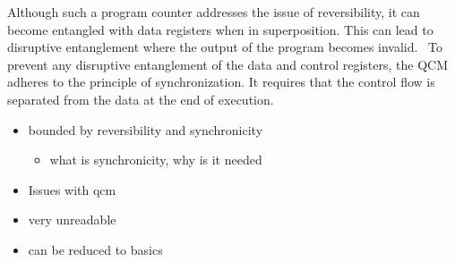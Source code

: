 Although such a program counter addresses the issue of reversibility, it can become entangled with data registers when in superposition. This can lead to disruptive entanglement where the output of the program becomes invalid.~\cite{YVC24} To prevent any disruptive entanglement of the data and control registers, the QCM adheres to the principle of synchronization. It requires that the control flow is separated from the data at the end of execution. 

\begin{itemize}
    \item bounded by reversibility and synchronicity
    \begin{itemize}
        \item what is synchronicity, why is it needed
    \end{itemize}
\end{itemize}

\begin{itemize}
    \item Issues with qcm
    \item very unreadable
    \item can be reduced to basics
\end{itemize}